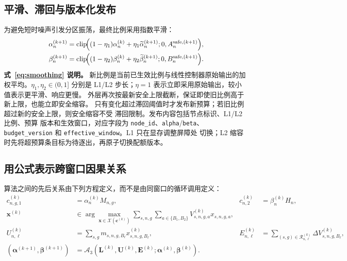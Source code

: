 \documentclass[UTF8,11pt,a4paper,fontset=fandol]{ctexart}
\newcommand{\code}[1]{\texttt{#1}}
\newcommand{\BOne}{B_1}
\newcommand{\BTwo}{B_2}
\begin{document}
\subsection{平滑、滞回与版本化发布}

为避免短时噪声引发分区振荡，最终比例采用指数平滑：
\begin{equation}
  \begin{aligned}
    \alpha_n^{(k+1)}
      &=\operatorname{clip}\!\Bigl(
        (1-\eta_1)\alpha_n^{(k)}
        +\eta_1\widetilde\alpha_n^{(k+1)};
        0,A_n^{\mathrm{safe},(k+1)}\Bigr),\\
    \beta_n^{(k+1)}
      &=\operatorname{clip}\!\Bigl(
        (1-\eta_2)\beta_n^{(k)}
        +\eta_2\widetilde\beta_n^{(k+1)};
        0,B_n^{\mathrm{safe},(k+1)}\Bigr).
  \end{aligned}
  \label{eq:smoothing}
\end{equation}
\noindent\textbf{式~\eqref{eq:smoothing} 说明。}
新比例是当前已生效比例与线性控制器原始输出的加权平均。$\eta_1,\eta_2\in(0,1]$
分别是 L1/L2 步长；$\eta=1$ 表示立即采用原始输出，较小值表示更平滑、响应更慢。
外层再次按最新安全上限截断，保证即使旧比例高于新上限，也能立即安全缩容。
只有变化超过滞回阈值时才发布新预算；若旧比例超过新的安全上限，则安全缩容不受
滞回限制。发布内容包括节点标识、L1/L2 比例、预算
版本和生效窗口，对应字段为 \code{node\_id}、\code{alpha}/\code{beta}、
\code{budget\_version} 和 \code{effective\_window}。L1 只在显存调整屏障处
切换；L2 缩容时先将超预算条目标为待逐出，再原子切换配额版本。

\subsection{用公式表示跨窗口因果关系}

算法之间的先后关系由下列方程定义，而不是由同窗口的循环调用定义：
\begin{align}
  c_{n,g,1}^{(k)}
    &=\alpha_n^{(k)}M_{n,g},
  &
  c_{n,2}^{(k)}
    &=\beta_n^{(k)}H_n,
  \label{eq:causal-budget}\\
  \mathbf x^{(k)}
    &\in
    \arg\max_{\mathbf x\in
      \mathcal X(\mathbf c^{(k)})}
    \sum_{s,n,g}\sum_{a\in\{\BOne,\BTwo\}}
      V_{s,n,g,a}^{(k)}x_{s,n,g,a},
  \label{eq:causal-placement}\\
  U_{n,\ell}^{(k)}
    &=\sum_{s,g}
      m_{s,n,g,B_\ell}x_{s,n,g,B_\ell}^{(k)},
  &
  E_{n,\ell}^{(k)}
    &=\sum_{(s,g)\in\mathcal R_{n,\ell}^{(k)}}
      \Delta V_{s,n,g,B_\ell}^{(k)},
  \label{eq:causal-feedback}\\
  (\boldsymbol\alpha^{(k+1)},\boldsymbol\beta^{(k+1)})
    &=
    \mathcal A_3\!\left(
      \mathbf L^{(k)},
      \mathbf U^{(k)},
      \mathbf E^{(k)};
      \boldsymbol\alpha^{(k)},
      \boldsymbol\beta^{(k)}
    \right).
  \label{eq:causal-next}
\end{align}
\end{document}
